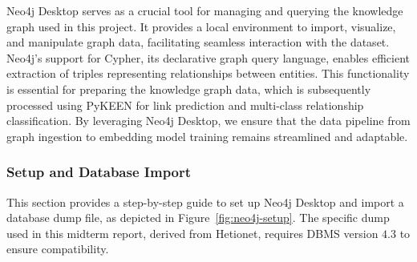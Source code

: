 Neo4j Desktop \cite{neo4j} serves as a crucial tool for managing and querying the knowledge graph used in this project. It provides a local environment to import, visualize, and manipulate graph data, facilitating seamless interaction with the dataset. Neo4j's support for Cypher, its declarative graph query language, enables efficient extraction of triples representing relationships between entities. This functionality is essential for preparing the knowledge graph data, which is subsequently processed using PyKEEN for link prediction and multi-class relationship classification. By leveraging Neo4j Desktop, we ensure that the data pipeline from graph ingestion to embedding model training remains streamlined and adaptable.

\subsubsection*{Setup and Database Import}

This section provides a step-by-step guide to set up Neo4j Desktop and import a database dump file, as depicted in Figure~\ref{fig:neo4j-setup}. The specific dump used in this midterm report, derived from Hetionet, requires DBMS version $4.3$ to ensure compatibility.

